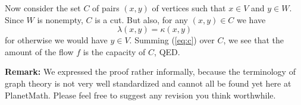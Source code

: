\documentclass[12pt]{article}
\begin{document}
Now consider the set $C$ of pairs $(x,y)$ of vertices such that
$x\in V$ and $y\in W$.
Since $W$ is nonempty, $C$ is a cut.
But also, for any $(x,y)\in C$ we have
\begin{equation} \label{eq:c}
\lambda(x,y)=\kappa(x,y)
\end{equation}
for otherwise we would have $y\in V$.
Summing (\ref{eq:c}) over $C$, we see that the amount of the
flow $f$ is the capacity of $C$, QED.

\textbf{Remark: } We expressed the proof rather informally, because the terminology of graph theory is not very well standardized and cannot all be found yet here at PlanetMath. Please feel free to suggest any revision you think worthwhile.
\end{document}
